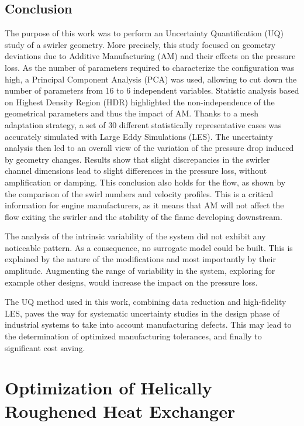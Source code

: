 \section{Conclusion}
The purpose of this work was to perform an Uncertainty Quantification (UQ) study of a swirler geometry. More precisely, this study focused on geometry deviations due to Additive Manufacturing (AM) and their effects on the pressure loss. As the number of parameters required to characterize the configuration was high, a Principal Component Analysis (PCA) was used, allowing to cut down the number of parameters from 16 to 6 independent variables. Statistic analysis based on Highest Density Region (HDR) highlighted the non-independence of the geometrical parameters and thus the impact of AM. Thanks to a mesh adaptation strategy, a set of 30 different statistically representative cases was accurately simulated with Large Eddy Simulations (LES). The uncertainty analysis then led to an overall view of the variation of the pressure drop induced by geometry changes. Results show that slight discrepancies in the swirler channel dimensions lead to slight differences in the pressure loss, without amplification or damping. This conclusion also holds for the flow, as shown by the comparison of the swirl numbers and velocity profiles. This is a critical information for engine manufacturers, as it means that AM will not affect the flow exiting the swirler and the stability of the flame developing downstream.

The analysis of the intrinsic variability of the system did not exhibit any noticeable pattern. As a consequence, no surrogate model could be built. This is explained by the nature of the modifications and most importantly by their amplitude. Augmenting the range of variability in the system, exploring for example other designs, would increase the impact on the pressure loss. %

The UQ method used in this work, combining data reduction and high-fidelity LES, paves the way for systematic uncertainty studies in the design phase of industrial systems to take into account manufacturing defects. This may lead to the determination of optimized manufacturing tolerances, and finally to significant cost saving.

\chapter{Optimization of Helically Roughened Heat Exchanger}

